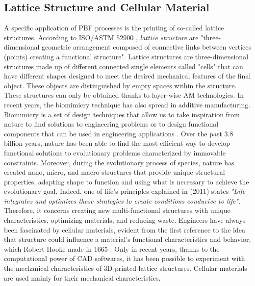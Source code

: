 \subsection{Lattice Structure and Cellular Material} \label{subsec:lattice}
A specific application of PBF processes is the printing of so-called lattice structures. According to ISO/ASTM 52900 \cite{organization_isoastm_2015}, \emph{lattice structure} are "three-dimensional geometric arrangement composed of connective links between vertices (points) creating a functional structure". Lattice structures are three-dimensional structures made up of different connected single elements called "cells" that can have different shapes designed to meet the desired mechanical features of the final object. These objects are distinguished by empty spaces within the structure. These structures can only be obtained thanks to layer-wise AM technologies. In recent years, the biomimicry technique has also spread in additive manufacturing. Biomimicry is a set of design techniques that allow us to take inspiration from nature to find solutions to engineering problems or to design functional components that can be used in engineering applications \cite{pathak_biomimicry_2019, du_plessis_beautiful_2019}. Over the past 3.8 billion years, nature has been able to find the most efficient way to develop functional solutions to evolutionary problems characterized by immovable constraints. Moreover, during the evolutionary process of species, nature has created nano, micro, and macro-structures that provide unique structural properties, adapting shape to function and using what is necessary to achieve the evolutionary goal. Indeed, one of life's principles explained in \citeauthor{baumeister_biomimicry_2011} (2011) states \textit{"Life integrates and optimizes these strategies to create conditions conducive to life"}. Therefore, it concerns creating new multi-functional structures with unique characteristics, optimizing materials, and reducing waste. Engineers have always been fascinated by cellular materials, evident from the first reference to the idea that structure could influence a material's functional characteristics and behavior, which Robert Hooke made in 1665 \cite{l_gibson_cellular_2010}. Only in recent years, thanks to the computational power of CAD softwares, it has been possible to experiment with the mechanical characteristics of 3D-printed lattice structures. Cellular materials are used mainly for their mechanical characteristics.
